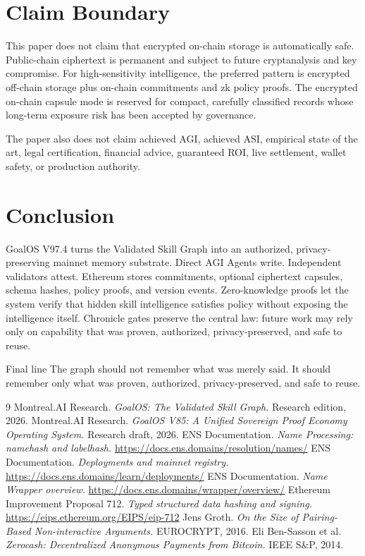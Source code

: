 \documentclass[11pt]{article}
\begin{document}
\section{Claim Boundary}
This paper does not claim that encrypted on-chain storage is automatically safe. Public-chain ciphertext is permanent and subject to future cryptanalysis and key compromise. For high-sensitivity intelligence, the preferred pattern is encrypted off-chain storage plus on-chain commitments and zk policy proofs. The encrypted on-chain capsule mode is reserved for compact, carefully classified records whose long-term exposure risk has been accepted by governance.

The paper also does not claim achieved AGI, achieved ASI, empirical state of the art, legal certification, financial advice, guaranteed ROI, live settlement, wallet safety, or production authority.

\section{Conclusion}
GoalOS V97.4 turns the Validated Skill Graph into an authorized, privacy-preserving mainnet memory substrate. Direct AGI Agents write. Independent validators attest. Ethereum stores commitments, optional ciphertext capsules, schema hashes, policy proofs, and version events. Zero-knowledge proofs let the system verify that hidden skill intelligence satisfies policy without exposing the intelligence itself. Chronicle gates preserve the central law: future work may rely only on capability that was proven, authorized, privacy-preserved, and safe to reuse.

\begin{thesisbox}{Final line}
The graph should not remember what was merely said. It should remember only what was proven, authorized, privacy-preserved, and safe to reuse.
\end{thesisbox}

\begin{thebibliography}{9}
 Montreal.AI Research. \emph{GoalOS: The Validated Skill Graph.} Research edition, 2026.
 Montreal.AI Research. \emph{GoalOS V85: A Unified Sovereign Proof Economy Operating System.} Research draft, 2026.
 ENS Documentation. \emph{Name Processing: namehash and labelhash.} \url{https://docs.ens.domains/resolution/names/}
 ENS Documentation. \emph{Deployments and mainnet registry.} \url{https://docs.ens.domains/learn/deployments/}
 ENS Documentation. \emph{Name Wrapper overview.} \url{https://docs.ens.domains/wrapper/overview/}
 Ethereum Improvement Proposal 712. \emph{Typed structured data hashing and signing.} \url{https://eips.ethereum.org/EIPS/eip-712}
 Jens Groth. \emph{On the Size of Pairing-Based Non-interactive Arguments.} EUROCRYPT, 2016.
 Eli Ben-Sasson et al. \emph{Zerocash: Decentralized Anonymous Payments from Bitcoin.} IEEE S\&P, 2014.
\end{thebibliography}
\end{document}
